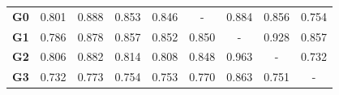 \begin{table}[t]
\begin{tabular}{@{}lllllllll@{}}
\multicolumn{1}{l|}{\textbf{G0}} & \multicolumn{1}{l|}{0.801} & \multicolumn{1}{l|}{0.888} & \multicolumn{1}{l|}{0.853} & \multicolumn{1}{l|}{0.846} & \multicolumn{1}{c|}{-} & \multicolumn{1}{l|}{0.884} & \multicolumn{1}{l|}{0.856} & \multicolumn{1}{l|}{0.754} \\ \cmidrule(l){2-9}
\multicolumn{1}{l|}{\textbf{G1}} & \multicolumn{1}{l|}{0.786} & \multicolumn{1}{l|}{0.878} & \multicolumn{1}{l|}{0.857} & \multicolumn{1}{l|}{0.852} & \multicolumn{1}{l|}{0.850} & \multicolumn{1}{c|}{-} & \multicolumn{1}{l|}{0.928} & \multicolumn{1}{l|}{0.857} \\ \cmidrule(l){2-9}
\multicolumn{1}{l|}{\textbf{G2}} & \multicolumn{1}{l|}{\cellcolor[HTML]{EFEFEF}0.806} & \multicolumn{1}{l|}{\cellcolor[HTML]{EFEFEF}0.882} & \multicolumn{1}{l|}{\cellcolor[HTML]{EFEFEF}0.814} & \multicolumn{1}{l|}{\cellcolor[HTML]{EFEFEF}0.808} & \multicolumn{1}{l|}{\cellcolor[HTML]{EFEFEF}0.848} & \multicolumn{1}{l|}{\cellcolor[HTML]{EFEFEF}0.963} & \multicolumn{1}{c|}{\cellcolor[HTML]{EFEFEF}-} & \multicolumn{1}{l|}{\cellcolor[HTML]{EFEFEF}0.732} \\ \cmidrule(l){2-9}
\multicolumn{1}{l|}{\textbf{G3}} & \multicolumn{1}{l|}{0.732} & \multicolumn{1}{l|}{0.773} & \multicolumn{1}{l|}{0.754} & \multicolumn{1}{l|}{0.753} & \multicolumn{1}{l|}{0.770} & \multicolumn{1}{l|}{0.863} & \multicolumn{1}{l|}{0.751} & \multicolumn{1}{c|}{-} \\ \cmidrule(l){2-9}
\end{tabular}
\end{table}


